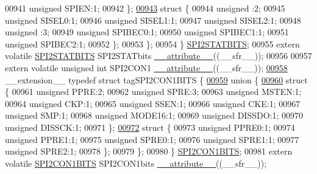 \begin{DoxyCode}
00941       \textcolor{keywordtype}{unsigned} SPIEN:1;
00942     \};
\hypertarget{a00009_source_l00943}{}\hyperlink{a00009}{00943}     \textcolor{keyword}{struct }\{
00944       \textcolor{keywordtype}{unsigned} :2;
00945       \textcolor{keywordtype}{unsigned} SISEL0:1;
00946       \textcolor{keywordtype}{unsigned} SISEL1:1;
00947       \textcolor{keywordtype}{unsigned} SISEL2:1;
00948       \textcolor{keywordtype}{unsigned} :3;
00949       \textcolor{keywordtype}{unsigned} SPIBEC0:1;
00950       \textcolor{keywordtype}{unsigned} SPIBEC1:1;
00951       \textcolor{keywordtype}{unsigned} SPIBEC2:1;
00952     \};
00953   \};
00954 \} \hyperlink{a00008_dd/d51/a00769}{SPI2STATBITS};
00955 \textcolor{keyword}{extern} \textcolor{keyword}{volatile} \hyperlink{a00008_dd/d51/a00769}{SPI2STATBITS} SPI2STATbits \hyperlink{a00009_a493c46f03454991ccc5aa7a6e1dfb2a7}{\_\_attribute\_\_}((\_\_sfr\_\_));
00956 
00957 \textcolor{keyword}{extern} \textcolor{keyword}{volatile} \textcolor{keywordtype}{unsigned} \textcolor{keywordtype}{int}  SPI2CON1 \hyperlink{a00009_a493c46f03454991ccc5aa7a6e1dfb2a7}{\_\_attribute\_\_}((\_\_sfr\_\_));
\hypertarget{a00009_source_l00958}{}\hyperlink{a00008}{00958} \_\_extension\_\_ \textcolor{keyword}{typedef} \textcolor{keyword}{struct }tagSPI2CON1BITS \{
\hypertarget{a00009_source_l00959}{}\hyperlink{a00009}{00959}   \textcolor{keyword}{union }\{
\hypertarget{a00009_source_l00960}{}\hyperlink{a00009}{00960}     \textcolor{keyword}{struct }\{
00961       \textcolor{keywordtype}{unsigned} PPRE:2;
00962       \textcolor{keywordtype}{unsigned} SPRE:3;
00963       \textcolor{keywordtype}{unsigned} MSTEN:1;
00964       \textcolor{keywordtype}{unsigned} CKP:1;
00965       \textcolor{keywordtype}{unsigned} SSEN:1;
00966       \textcolor{keywordtype}{unsigned} CKE:1;
00967       \textcolor{keywordtype}{unsigned} SMP:1;
00968       \textcolor{keywordtype}{unsigned} MODE16:1;
00969       \textcolor{keywordtype}{unsigned} DISSDO:1;
00970       \textcolor{keywordtype}{unsigned} DISSCK:1;
00971     \};
\hypertarget{a00009_source_l00972}{}\hyperlink{a00009}{00972}     \textcolor{keyword}{struct }\{
00973       \textcolor{keywordtype}{unsigned} PPRE0:1;
00974       \textcolor{keywordtype}{unsigned} PPRE1:1;
00975       \textcolor{keywordtype}{unsigned} SPRE0:1;
00976       \textcolor{keywordtype}{unsigned} SPRE1:1;
00977       \textcolor{keywordtype}{unsigned} SPRE2:1;
00978     \};
00979   \};
00980 \} \hyperlink{a00008_dc/de2/a00765}{SPI2CON1BITS};
00981 \textcolor{keyword}{extern} \textcolor{keyword}{volatile} \hyperlink{a00008_dc/de2/a00765}{SPI2CON1BITS} SPI2CON1bits \hyperlink{a00009_a493c46f03454991ccc5aa7a6e1dfb2a7}{\_\_attribute\_\_}((\_\_sfr\_\_));

\end{DoxyCode}
